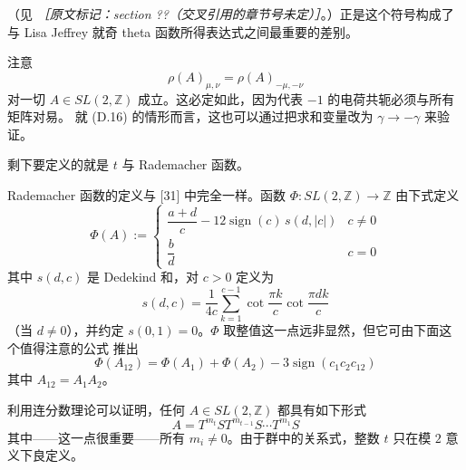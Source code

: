 
（见 {\small\itshape ［原文标记：section ??（交叉引用的章节号未定）］}。）正是这个符号构成了与
Lisa Jeffrey 就奇 theta 函数所得表达式之间最重要的差别。

注意
\begin{equation}
  \rho(A)_{\mu,\nu} = \rho(A)_{-\mu,-\nu}
  \tag{D.17}
  \label{eq:D.17}
\end{equation}
对一切 $A\in SL(2,\mathbb{Z})$ 成立。这必定如此，因为代表 $-1$ 的电荷共轭必须与所有矩阵对易。
就 (D.16) 的情形而言，这也可以通过把求和变量改为 $\gamma\to-\gamma$ 来验证。

剩下要定义的就是 $t$ 与 Rademacher 函数。

Rademacher 函数的定义与 [31] 中完全一样。函数 $\Phi:SL(2,\mathbb{Z})\to\mathbb{Z}$ 由下式定义
\begin{equation}
  \Phi(A) :=
  \begin{cases}
    \dfrac{a+d}{c}-12\operatorname{sign}(c)\,s(d,|c|) & c\ne 0\\[2mm]
    \dfrac{b}{d} & c=0
  \end{cases}
  \tag{D.18}
  \label{eq:D.18}
\end{equation}
其中 $s(d,c)$ 是 Dedekind 和，对 $c>0$ 定义为
\begin{equation}
  s(d,c) = \frac{1}{4c}\sum_{k=1}^{c-1}\cot\frac{\pi k}{c}\cot\frac{\pi dk}{c}
  \tag{D.19}
  \label{eq:D.19}
\end{equation}
（当 $d\ne 0$），并约定 $s(0,1)=0$。$\Phi$ 取整值这一点远非显然，但它可由下面这个值得注意的公式
推出
\begin{equation}
  \Phi(A_{12}) = \Phi(A_1)+\Phi(A_2)-3\operatorname{sign}(c_1c_2c_{12})
  \tag{D.20}
  \label{eq:D.20}
\end{equation}
其中 $A_{12}=A_1A_2$。

利用连分数理论可以证明，任何 $A\in SL(2,\mathbb{Z})$ 都具有如下形式
\begin{equation}
  A = T^{m_t}ST^{m_{t-1}}S\cdots T^{m_1}S
  \tag{D.21}
  \label{eq:D.21}
\end{equation}
其中——这一点很重要——所有 $m_i\ne 0$。由于群中的关系式，整数 $t$ 只在模 $2$ 意义下良定义。

